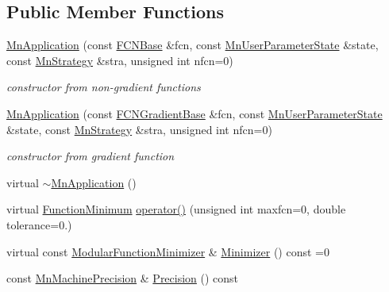 \subsection*{Public Member Functions}
\begin{DoxyCompactItemize}
\item 
\mbox{\hyperlink{classROOT_1_1Minuit2_1_1MnApplication_ac3bea3d025068f8bc7d8a6701f23aa81}{Mn\+Application}} (const \mbox{\hyperlink{classROOT_1_1Minuit2_1_1FCNBase}{F\+C\+N\+Base}} \&fcn, const \mbox{\hyperlink{classROOT_1_1Minuit2_1_1MnUserParameterState}{Mn\+User\+Parameter\+State}} \&state, const \mbox{\hyperlink{classROOT_1_1Minuit2_1_1MnStrategy}{Mn\+Strategy}} \&stra, unsigned int nfcn=0)
\begin{DoxyCompactList}\small\item\em constructor from non-\/gradient functions \end{DoxyCompactList}\item 
\mbox{\hyperlink{classROOT_1_1Minuit2_1_1MnApplication_a07b6eb3c240c0d2360d466ab1f1a85ec}{Mn\+Application}} (const \mbox{\hyperlink{classROOT_1_1Minuit2_1_1FCNGradientBase}{F\+C\+N\+Gradient\+Base}} \&fcn, const \mbox{\hyperlink{classROOT_1_1Minuit2_1_1MnUserParameterState}{Mn\+User\+Parameter\+State}} \&state, const \mbox{\hyperlink{classROOT_1_1Minuit2_1_1MnStrategy}{Mn\+Strategy}} \&stra, unsigned int nfcn=0)
\begin{DoxyCompactList}\small\item\em constructor from gradient function \end{DoxyCompactList}\item 
virtual \mbox{\hyperlink{classROOT_1_1Minuit2_1_1MnApplication_ab8f38ab869bbfe082a2dbcefe1fb19de}{$\sim$\+Mn\+Application}} ()
\item 
virtual \mbox{\hyperlink{classROOT_1_1Minuit2_1_1FunctionMinimum}{Function\+Minimum}} \mbox{\hyperlink{classROOT_1_1Minuit2_1_1MnApplication_a8908d50d5d4f7f011b94bd10e51eacf7}{operator()}} (unsigned int maxfcn=0, double tolerance=0.)
\item 
virtual const \mbox{\hyperlink{classROOT_1_1Minuit2_1_1ModularFunctionMinimizer}{Modular\+Function\+Minimizer}} \& \mbox{\hyperlink{classROOT_1_1Minuit2_1_1MnApplication_a5a8e1e2658b731b5f4023dd1b1594223}{Minimizer}} () const =0
\item 
const \mbox{\hyperlink{classROOT_1_1Minuit2_1_1MnMachinePrecision}{Mn\+Machine\+Precision}} \& \mbox{\hyperlink{classROOT_1_1Minuit2_1_1MnApplication_a8de6eb3be52721cec183ba830504e7bc}{Precision}} () const
\item 

\end{DoxyCompactItemize}
